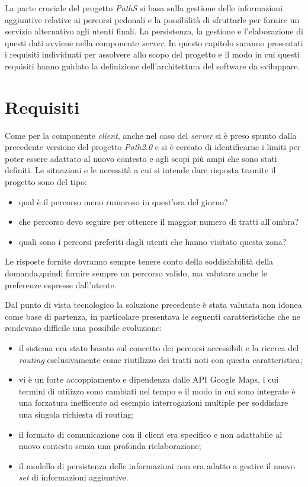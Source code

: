 La parte cruciale del progetto \emph{PathS} si basa sulla gestione delle informazioni aggiuntive relative ai percorsi pedonali e la possibilità di sfruttarle per fornire un servizio alternativo agli utenti finali. La persistenza, la gestione e l'elaborazione di questi dati avviene nella componente \emph{server}. 
In questo capitolo saranno presentati i requisiti individuati per assolvere allo scopo del progetto e il modo in cui questi requisiti hanno guidato la definizione dell'architettura del software da sviluppare.

\section{Requisiti}
Come per la componente \emph{client}, anche nel caso del \emph{server} si è preso spunto dalla precedente versione del progetto \emph{Path2.0} e si è cercato di identificarne i limiti per poter essere adattato al nuovo contesto e agli scopi più ampi che sono stati definiti. Le situazioni e le necessità a cui si intende dare risposta tramite il progetto sono del tipo:
\begin{itemize}
\item qual è il percorso meno rumoroso in quest’ora del giorno?
\item che percorso devo seguire per ottenere il maggior numero di tratti all’ombra?
\item quali sono i percorsi preferiti dagli utenti che hanno visitato questa zona?
\end{itemize}
Le risposte fornite dovranno sempre tenere conto della soddisfabilità della domanda,quindi fornire sempre un percorso valido, ma valutare anche le preferenze espresse dall’utente.

Dal punto di vista tecnologico la soluzione precedente è stata valutata non idonea come base di partenza, in particolare presentava le seguenti caratteristiche che ne rendevano difficile una possibile evoluzione:
\begin{itemize}
\item il sistema era stato basato sul concetto dei percorsi accessibili e la ricerca del \emph{routing} esclusivamente come riutilizzo dei tratti noti con questa caratteristica;
\item vi è un forte accoppiamento e dipendenza dalle API Google Maps, i cui termini di utilizzo sono cambiati nel tempo e il modo in cui sono integrate è una forzatura inefficente ad esempio interrogazioni multiple per soddisfare una singola richiesta di routing;
\item il formato di comunicazione con il client era specifico e non adattabile al nuovo contesto senza una profonda rielaborazione;
\item il modello di persistenza delle informazioni non era adatto a gestire il nuovo \emph{set} di informazioni aggiuntive.
\end{itemize}

